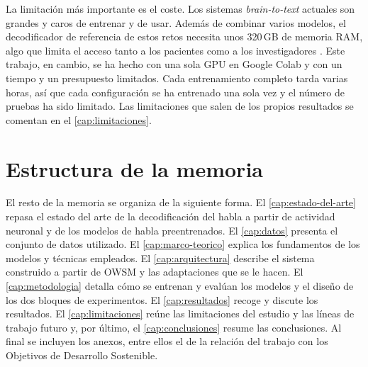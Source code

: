 La limitación más importante es el coste. Los sistemas \textit{brain-to-text} actuales son grandes y caros de entrenar y de usar. Además de combinar varios modelos, el decodificador de referencia de estos retos necesita unos 320\,GB de memoria RAM, algo que limita el acceso tanto a los pacientes como a los investigadores \cite{lightbeam}. Este trabajo, en cambio, se ha hecho con una sola GPU en Google Colab y con un tiempo y un presupuesto limitados. Cada entrenamiento completo tarda varias horas, así que cada configuración se ha entrenado una sola vez y el número de pruebas ha sido limitado. Las limitaciones que salen de los propios resultados se comentan en el \cref{cap:limitaciones}.

\section{Estructura de la memoria}
\label{sec:estructura}

El resto de la memoria se organiza de la siguiente forma. El \cref{cap:estado-del-arte} repasa el estado del arte de la decodificación del habla a partir de actividad neuronal y de los modelos de habla preentrenados. El \cref{cap:datos} presenta el conjunto de datos utilizado. El \cref{cap:marco-teorico} explica los fundamentos de los modelos y técnicas empleados. El \cref{cap:arquitectura} describe el sistema construido a partir de OWSM y las adaptaciones que se le hacen. El \cref{cap:metodologia} detalla cómo se entrenan y evalúan los modelos y el diseño de los dos bloques de experimentos. El \cref{cap:resultados} recoge y discute los resultados. El \cref{cap:limitaciones} reúne las limitaciones del estudio y las líneas de trabajo futuro y, por último, el \cref{cap:conclusiones} resume las conclusiones. Al final se incluyen los anexos, entre ellos el de la relación del trabajo con los Objetivos de Desarrollo Sostenible.

